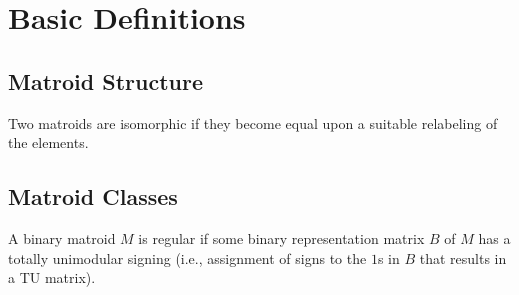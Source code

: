 \section{Basic Definitions}

\subsection{Matroid Structure}

\begin{definition}[matroid]
  \label{def:matroid}
\end{definition}

\begin{definition}[isomorphism]
  \label{def:isomorphism}
  Two matroids are isomorphic if they become equal upon a suitable relabeling of the elements.
\end{definition}

\begin{definition}[loop]
  \label{def:loop}
\end{definition}

\begin{definition}[coloop]
  \label{def:coloop}
\end{definition}

\begin{definition}
  \label{def:parallel_elems}
\end{definition}

\begin{definition}
  \label{def:series_elems}
\end{definition}


\subsection{Matroid Classes}

\begin{definition}
  \label{def:binary_matroid}
\end{definition}

\begin{definition}
  \label{def:regular_matroid}
  A binary matroid $M$ is regular if some binary representation matrix $B$ of $M$ has a totally unimodular signing (i.e., assignment of signs to the $1$s in $B$ that results in a TU matrix).
\end{definition}

